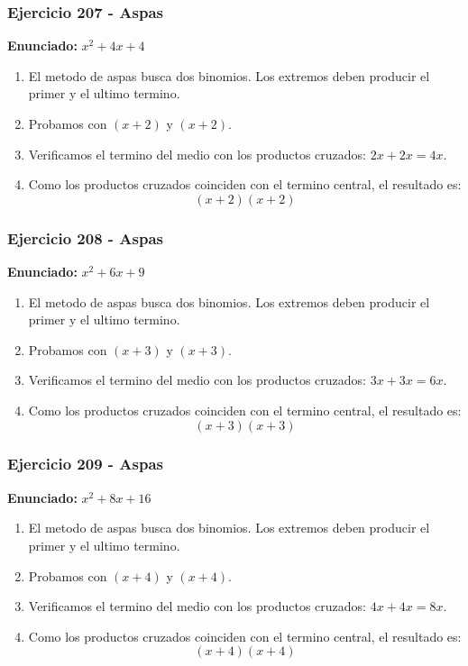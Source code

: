 \documentclass[11pt,a4paper]{article}
\begin{document}
\vspace{0.2cm}
\subsubsection*{Ejercicio 207 - Aspas}
\textbf{Enunciado:} $ x^{2} + 4 x + 4 $\par
\begin{enumerate}[leftmargin=2em]
\item El metodo de aspas busca dos binomios. Los extremos deben producir el primer y el ultimo termino.
\item Probamos con \((x + 2)\) y \((x + 2)\).
\item Verificamos el termino del medio con los productos cruzados: \(2 x+2 x=4 x\).
\item Como los productos cruzados coinciden con el termino central, el resultado es: \[\boxed{\left(x + 2\right)\left(x + 2\right)}\]
\end{enumerate}

\vspace{0.2cm}
\subsubsection*{Ejercicio 208 - Aspas}
\textbf{Enunciado:} $ x^{2} + 6 x + 9 $\par
\begin{enumerate}[leftmargin=2em]
\item El metodo de aspas busca dos binomios. Los extremos deben producir el primer y el ultimo termino.
\item Probamos con \((x + 3)\) y \((x + 3)\).
\item Verificamos el termino del medio con los productos cruzados: \(3 x+3 x=6 x\).
\item Como los productos cruzados coinciden con el termino central, el resultado es: \[\boxed{\left(x + 3\right)\left(x + 3\right)}\]
\end{enumerate}

\vspace{0.2cm}
\subsubsection*{Ejercicio 209 - Aspas}
\textbf{Enunciado:} $ x^{2} + 8 x + 16 $\par
\begin{enumerate}[leftmargin=2em]
\item El metodo de aspas busca dos binomios. Los extremos deben producir el primer y el ultimo termino.
\item Probamos con \((x + 4)\) y \((x + 4)\).
\item Verificamos el termino del medio con los productos cruzados: \(4 x+4 x=8 x\).
\item Como los productos cruzados coinciden con el termino central, el resultado es: \[\boxed{\left(x + 4\right)\left(x + 4\right)}\]
\end{enumerate}
\end{document}
